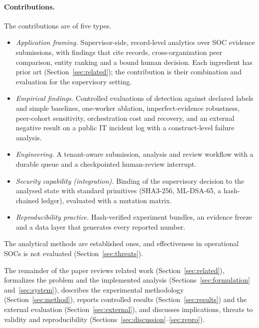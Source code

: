 \paragraph{Contributions.} The contributions are of five types.
\begin{itemize}
\item \emph{Application framing.} Supervisor-side,
record-level analytics over SOC evidence submissions, with findings that cite
records, cross-organization peer comparison, entity ranking and a bound human
decision. Each ingredient has prior art (Section~\ref{sec:related}); the contribution
is their combination and evaluation for the supervisory setting.
\item \emph{Empirical findings.} Controlled evaluations of detection against declared
labels and simple baselines, one-worker ablation, imperfect-evidence robustness,
peer-cohort sensitivity, orchestration cost and recovery, and an external negative
result on a public IT incident log with a construct-level failure analysis.
\item \emph{Engineering.} A tenant-aware submission, analysis and review workflow with
a durable queue and a checkpointed human-review interrupt.
\item \emph{Security capability (integration).} Binding of the supervisory decision to
the analysed state with standard primitives (SHA3-256, ML-DSA-65, a hash-chained
ledger), evaluated with a mutation matrix.
\item \emph{Reproducibility practice.} Hash-verified experiment bundles, an evidence
freeze and a data layer that generates every reported number.
\end{itemize}
The analytical methods are established ones, and effectiveness in operational SOCs
is not evaluated (Section~\ref{sec:threats}).

The remainder of the paper reviews related work (Section~\ref{sec:related}), formalizes
the problem and the implemented analysis (Sections~\ref{sec:formulation}
and~\ref{sec:system}), describes the experimental methodology
(Section~\ref{sec:method}), reports controlled results (Section~\ref{sec:results}) and
the external evaluation (Section~\ref{sec:external}), and discusses implications,
threats to validity and reproducibility (Sections~\ref{sec:discussion}--\ref{sec:repro}).
